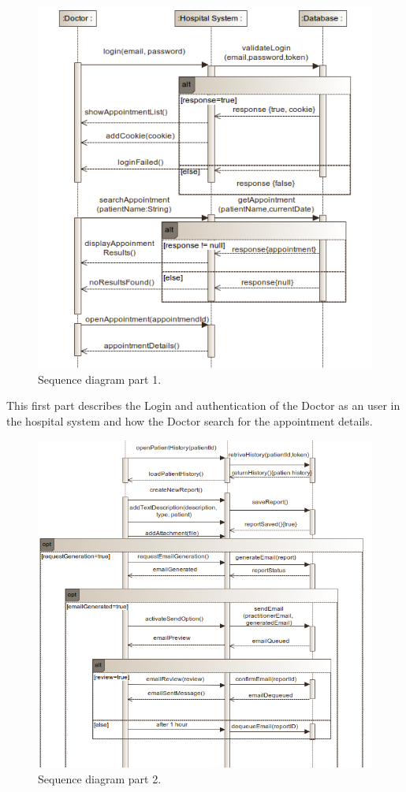\documentclass{article}
\begin{document}
            \begin{figure}[H]
                \centering 
                \includegraphics[width=.8\linewidth]{./img/seq1.png}
                \caption{Sequence diagram part 1.}
                \label{fig:sequence1}
            \end{figure}

            This first part describes the Login and authentication of the Doctor as an user in the hospital system and how the Doctor search for the appointment details.
            \begin{figure}[H]
                \centering 
                \includegraphics[width=.8\linewidth]{./img/seq2.png}
                \caption{Sequence diagram part 2.}
                \label{fig:sequence2}
            \end{figure}
\end{document}
